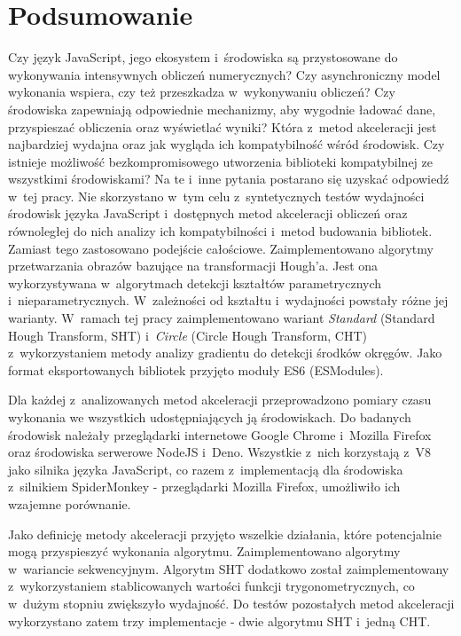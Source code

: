 \chapter{Podsumowanie}

Czy język JavaScript, jego ekosystem i~środowiska są przystosowane do wykonywania intensywnych obliczeń numerycznych? Czy asynchroniczny model wykonania wspiera, czy też przeszkadza w~wykonywaniu obliczeń? Czy środowiska zapewniają odpowiednie mechanizmy, aby wygodnie ładować dane, przyspieszać obliczenia oraz wyświetlać wyniki? Która z~metod akceleracji jest najbardziej wydajna oraz jak wygląda ich kompatybilność wśród środowisk. Czy istnieje możliwość bezkompromisowego utworzenia biblioteki kompatybilnej ze wszystkimi środowiskami? Na te i~inne pytania postarano się uzyskać odpowiedź w~tej pracy. Nie skorzystano w~tym celu z~syntetycznych testów wydajności środowisk języka JavaScript i~dostępnych metod akceleracji obliczeń oraz równoległej do nich analizy ich kompatybilności i~metod budowania bibliotek. Zamiast tego zastosowano podejście całościowe. Zaimplementowano algorytmy przetwarzania obrazów bazujące na transformacji Hough'a. Jest ona wykorzystywana w~algorytmach detekcji kształtów parametrycznych i~nieparametrycznych. W~zależności od kształtu i~wydajności powstały różne jej warianty. W~ramach tej pracy zaimplementowano wariant \textit{Standard} (Standard Hough Transform, SHT) i~\textit{Circle} (Circle Hough Transform, CHT) z~wykorzystaniem metody analizy gradientu do detekcji środków okręgów. Jako format eksportowanych bibliotek przyjęto moduły ES6 (ESModules).

Dla każdej z~analizowanych metod akceleracji przeprowadzono pomiary czasu wykonania we wszystkich udostępniających ją środowiskach. Do badanych środowisk należały przeglądarki internetowe Google Chrome i~Mozilla Firefox oraz środowiska serwerowe NodeJS i~Deno. Wszystkie z~nich korzystają z~V8 jako silnika języka JavaScript, co razem z~implementacją dla środowiska z~silnikiem SpiderMonkey - przeglądarki Mozilla Firefox, umożliwiło ich wzajemne porównanie. 

Jako definicję metody akceleracji przyjęto wszelkie działania, które potencjalnie mogą przyspieszyć wykonania algorytmu. Zaimplementowano algorytmy w~wariancie sekwencyjnym. Algorytm SHT dodatkowo został zaimplementowany z~wykorzystaniem stablicowanych wartości funkcji trygonometrycznych, co w~dużym stopniu zwiększyło wydajność. Do testów pozostałych metod akceleracji wykorzystano zatem trzy implementacje - dwie algorytmu SHT i~jedną CHT.

